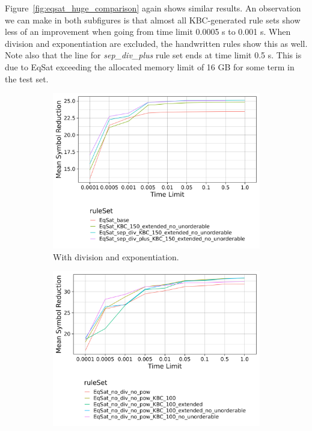 Figure~\ref{fig:eqsat_huge_comparison} again shows similar results. An observation we can make in both subfigures is that almost all KBC-generated rule sets show less of an improvement when going from time limit 0.0005 s to 0.001 s. When division and exponentiation are excluded, the handwritten rules show this as well. Note also that the line for \emph{sep\_div\_plus} rule set ends at time limit 0.5 s. This is due to EqSat exceeding the allocated memory limit of 16 GB for some term in the test set.

\begin{figure}[h]
	\centering
	\begin{subfigure}[t]{0.48\textwidth}
		\includegraphics[width=\linewidth]{img/by_rule_set_random_terms_huge.png}
		\caption{With division and exponentiation.}
		\label{fig:eqsat_huge_with_div}
	\end{subfigure}\hfill
	\begin{subfigure}[t]{0.48\textwidth}
		\includegraphics[width=\linewidth]{img/by_rule_set_no_div_no_pow_random_terms_huge.png}

\end{subfigure}
\end{figure}
